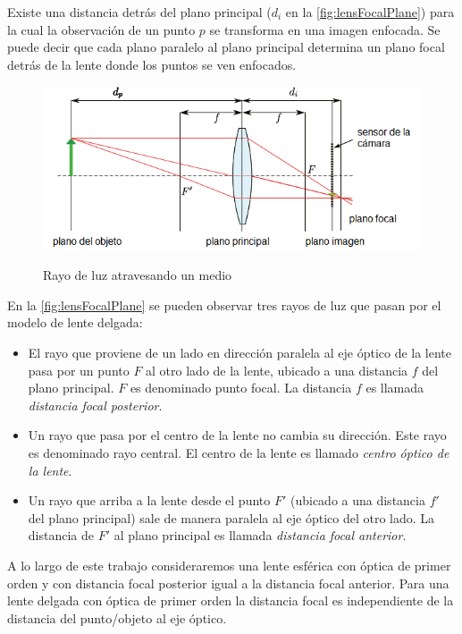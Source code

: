 Existe una distancia detrás del plano principal ($d_i$ en la \autoref{fig:lensFocalPlane}) para la cual la observación de un punto $p$ se transforma en una imagen enfocada. Se puede decir que cada plano paralelo al plano principal determina un plano focal detrás de la lente donde los puntos se ven enfocados.
\begin{figure}[bth]
    \centering
        {\includegraphics[width=1.\linewidth]{images/lensFocalPlane}}
        \caption{Rayo de luz atravesando un medio}
        \label{fig:lensFocalPlane}
\end{figure}

En la \autoref{fig:lensFocalPlane} se pueden observar tres rayos de luz que pasan por el modelo de lente delgada:
\begin{itemize}
\item El rayo que proviene de un lado en dirección paralela al eje óptico de la lente pasa por un punto $F$ al otro lado de la lente, ubicado a una distancia $f$ del plano principal. $F$ es denominado punto focal. La distancia $f$ es llamada \emph{distancia focal posterior}.
\item Un rayo que pasa por el centro de la lente no cambia su dirección. Este rayo es denominado rayo central. El centro de la lente es llamado \emph{centro óptico de la lente}.
\item Un rayo que arriba a la lente desde el punto $F'$ (ubicado a una distancia $f'$ del plano principal) sale de manera paralela al eje óptico del otro lado. La distancia de $F'$ al plano principal es llamada \emph{distancia focal anterior}.
\end{itemize}

A lo largo de este trabajo consideraremos una lente esférica con óptica de primer orden y con distancia focal posterior igual a la distancia focal anterior. Para una lente delgada con óptica de primer orden la distancia focal es independiente de la distancia del punto/objeto al eje óptico.

